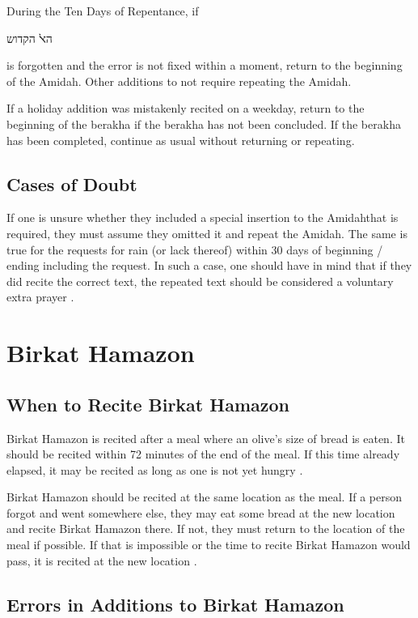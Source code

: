 \documentclass[11pt]{article}
\newcommand{\hebword}[1]{‎\begin{hebrew}\beginR #1 \endR\end{hebrew}}
\newcommand{\amidah}{Amidah\space}
\newcommand{\amidahnospace}{Amidah}
\begin{document}
During the Ten Days of Repentance, if \hebword{הﭏ הקדוש} is forgotten and the error is not fixed within a moment, return to the beginning of the \amidahnospace.  Other additions to not require repeating the \amidahnospace.

If a holiday addition was mistakenly recited on a weekday, return to the beginning of the berakha if the berakha has not been concluded.  If the berakha has been completed, continue as usual without returning or repeating.

\subsection{Cases of Doubt}

If one is unsure whether they included a special insertion to the \amidah that is required, they must assume they omitted it and repeat the \amidahnospace.  The same is true for the requests for rain (or lack thereof) within 30 days of beginning / ending including the request.  In such a case, one should have in mind that if they did recite the correct text, the repeated text should be considered a voluntary extra prayer \parencite*[18:6]{PH}.

\section{Birkat Hamazon}

\subsection{When to Recite Birkat Hamazon}

Birkat Hamazon is recited after a meal where an olive's size of bread is eaten. It should be recited within 72 minutes of the end of the meal.  If this time already elapsed, it may be recited as long as one is not yet hungry \parencite*[44:8]{Kitzur}.

Birkat Hamazon should be recited at the same location as the meal. If a person forgot and went somewhere else, they may eat some bread at the new location and recite Birkat Hamazon there. If not, they must return to the location of the meal if possible.  If that is impossible or the time to recite Birkat Hamazon would pass, it is recited at the new location \parencite*[44:9]{Kitzur}.

\subsection{Errors in Additions to Birkat Hamazon}
\end{document}
